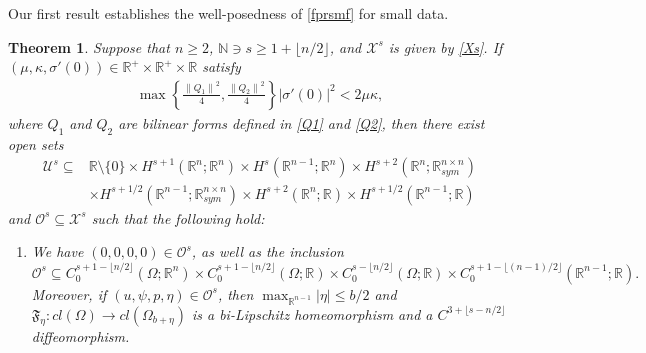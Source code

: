 \documentclass[11pt,letterpaper,reqno]{amsart}
\newtheorem{theorem}{Theorem}[section]
\numberwithin{equation}{section}
\newcommand{\abs}[1]{\left\lvert#1\right\rvert}
\newcommand{\norm}[1]{\left\lVert#1\right\rVert}
\begin{document}
Our first result establishes the well-posedness of \eqref{fprsmf} for small data.

\begin{theorem} \label{1.1analog}
    Suppose that \(n \geq 2\), \(\mathbb{N} \ni s \geq 1+\lfloor n/2 \rfloor\), and \(\mathcal{X}^{s}\) is given by \eqref{Xs}. If \((\mu,\kappa,\sigma'(0)) \in \mathbb{R}^{+} \times \mathbb{R}^{+} \times \mathbb{R}\) satisfy
    \begin{align}
        \max\left\{\frac{\norm{Q_{1}}^{2}}{4},\frac{\norm{Q_{2}}^{2}}{4}\right\}\abs{\sigma'(0)}^{2} < 2\mu\kappa,
    \end{align}
    where \(Q_{1}\) and \(Q_{2}\) are bilinear forms defined in \eqref{Q1} and \eqref{Q2}, then there exist open sets
    \begin{align}
        \mathcal{U}^{s} \subseteq & \mathbb{R} \setminus \{0\} \times H^{s+1}(\mathbb{R}^{n};\mathbb{R}^{n}) \times H^{s}(\mathbb{R}^{n-1};\mathbb{R}^{n}) \times H^{s+2}(\mathbb{R}^{n};\mathbb{R}_{sym}^{n \times n}) \nonumber\\
        &\times H^{s+1/2}(\mathbb{R}^{n-1};\mathbb{R}_{sym}^{n \times n}) \times H^{s+2}(\mathbb{R}^{n};\mathbb{R}) \times H^{s+1/2}(\mathbb{R}^{n-1};\mathbb{R})
    \end{align}
    and \(\mathcal{O}^{s}\subseteq \mathcal{X}^{s}\) such that the following hold:
    \begin{enumerate}
        \item We have $(0,0,0,0) \in \mathcal{O}^{s}$, as well as the inclusion
        \begin{equation}
            \mathcal{O}^{s} \subseteq  C_{0}^{s+1-\lfloor n/2\rfloor}(\Omega;\mathbb{R}^{n}) \times C_{0}^{s+1-\lfloor n/2\rfloor}(\Omega;\mathbb{R}) \times C_{0}^{s-\lfloor n/2 \rfloor}(\Omega;\mathbb{R}) \times  C_{0}^{s+1-\lfloor (n-1)/2\rfloor}(\mathbb{R}^{n-1};\mathbb{R}). 
        \end{equation}
        Moreover, if \((u,\psi,p,\eta) \in \mathcal{O}^{s}\), then   
        \(\max_{\mathbb{R}^{n-1}}\abs{\eta} \leq b/2\)  and \(\mathfrak{F}_{\eta}: cl(\Omega) \to cl({\Omega}_{b+\eta})\) is a bi-Lipschitz homeomorphism and a \(C^{3+\lfloor s-n/2\rfloor}\) diffeomorphism.
        

\end{enumerate}
\end{theorem}
\end{document}
